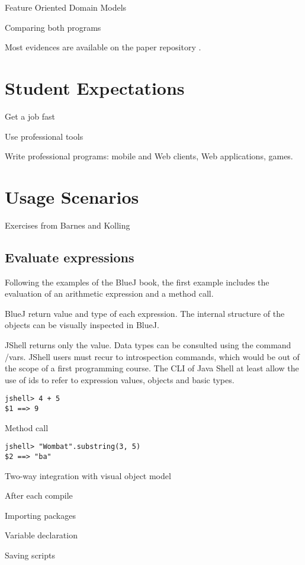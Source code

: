 \documentclass{article}
\begin{document}
Feature Oriented Domain Models

Comparing both programs


Most evidences are available on the paper repository \cite{mangan2025codepadjshell}.

\section{Student Expectations}

Get a job fast

Use professional tools

Write professional programs: mobile and Web clients, Web applications, games.

\section{Usage Scenarios}

Exercises from Barnes and Kolling

\subsection{Evaluate expressions}

Following the examples of the BlueJ book, the first example includes the evaluation of an arithmetic expression and a method call.

BlueJ return value and type of each expression. 
The internal structure of the objects can be visually inspected in BlueJ. 

JShell returns only the value. Data types can be consulted using the command /vars.
JShell users must recur to introspection commands, which would be out of the scope of a first programming course. 
The CLI of Java Shell at least allow the use of ids to refer to expression values,  objects  and basic types.

\begin{lstlisting}
jshell> 4 + 5
$1 ==> 9
\end{lstlisting}

Method call
\begin{lstlisting}
jshell> "Wombat".substring(3, 5)
$2 ==> "ba"
\end{lstlisting}
Two-way integration with visual object model

After each compile

Importing packages

Variable declaration

Saving scripts
\end{document}
